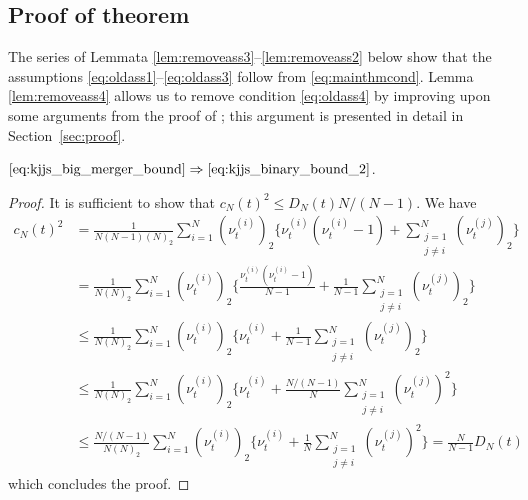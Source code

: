 \subsection{Proof of theorem \seb{$\sim$} }

The series of Lemmata \ref{lem:removeass3}--\ref{lem:removeass2} below show that the assumptions \eqref{eq:oldass1}--\eqref{eq:oldass3} follow from \eqref{eq:mainthmcond}. Lemma \ref{lem:removeass4} allows us to remove condition \eqref{eq:oldass4} by improving upon some arguments from the proof of \textcite[Theorem 1]{koskela2018}; this argument is presented in detail in Section~\ref{sec:proof}.

\begin{lemma} \label{lem:removeass3}
$\eqref{eq:kjjs_big_merger_bound} \Rightarrow \eqref{eq:kjjs_binary_bound_2}$.
\end{lemma}

\begin{proof}
It is sufficient to show that $c_N( t )^2 \leq D_N( t ) N/(N-1)$.
We have
\begin{align*}
c_N( t )^2 &= \frac{ 1 }{ N ( N - 1 ) ( N )_2 } \sum_{ i = 1 }^N ( \nu_t^{(i)})_2 \Bigg\{ \nu_t^{(i)} ( \nu_t^{(i)} - 1 ) + \sum_{\substack{j=1\\ j \neq i }}^N ( \nu_t^{(j)} )_2 \Bigg\} \\
&= \frac{ 1 }{ N ( N )_2 } \sum_{ i = 1 }^N ( \nu_t^{(i)} )_2 \Bigg\{ \frac{ \nu_t^{(i)} ( \nu_t^{(i)} - 1 ) }{ N - 1 } + \frac{ 1 }{ N - 1 } \sum_{\substack{j=1\\ j \neq i }}^N ( \nu_t^{(j)} )_2 \Bigg\} \\
&\leq \frac{ 1 }{ N ( N )_2 } \sum_{ i = 1 }^N ( \nu_t^{(i)})_2 \Bigg\{ \nu_t^{(i)} + \frac{ 1 }{ N - 1 } \sum_{\substack{j=1\\ j \neq i }}^N ( \nu_t^{(j)} )_2 \Bigg\} \\
&\leq \frac{ 1 }{ N ( N )_2 } \sum_{ i = 1 }^N ( \nu_t^{(i)})_2 \Bigg\{ \nu_t^{(i)} + \frac{ N / ( N - 1 ) }{ N } \sum_{\substack{j=1\\ j \neq i }}^N ( \nu_t^{(j)} )^2 \Bigg\} \\
&\leq \frac{ N / ( N - 1 ) }{ N ( N )_2 } \sum_{ i = 1 }^N ( \nu_t^{(i)})_2 \Bigg\{ \nu_t^{(i)} + \frac{ 1 }{ N } \sum_{\substack{j=1\\ j \neq i }}^N ( \nu_t^{(j)} )^2 \Bigg\} = \frac{ N }{ N - 1 } D_N( t )
\end{align*}
which concludes the proof.
\end{proof}



